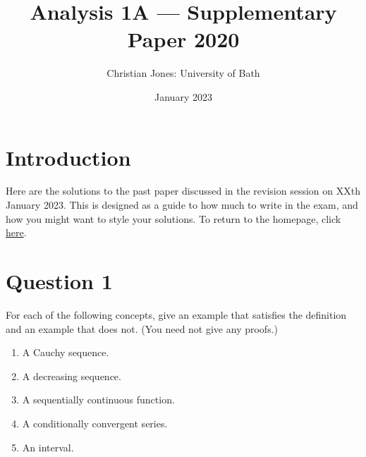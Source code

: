 \documentclass[
  12pt,
  a4paper]{extarticle}
\title{Analysis 1A --- Supplementary Paper 2020}
\author{Christian Jones: University of Bath}
\date{January 2023}
\providecommand{\tightlist}{%
  \setlength{\itemsep}{0pt}\setlength{\parskip}{0pt}}
\theoremstyle{plain}
\theoremstyle{definition}
\theoremstyle{plain}
\theoremstyle{plain}
\theoremstyle{plain}
\theoremstyle{plain}
\theoremstyle{definition}
\theoremstyle{definition}
\newtheorem*{Order Axioms*}{Order Axioms}\newtheorem{Order Axioms}{Order Axioms}[section]
\theoremstyle{remark}
\theoremstyle{remark}
\let\BeginKnitrBlock\begin \let\EndKnitrBlock\end
\renewcommand{\;}{\,}
\begin{document}
\maketitle

{
\setcounter{tocdepth}{2}
\tableofcontents
}
\newpage
{}

\hypertarget{introduction}{%
\section*{Introduction}\label{introduction}}

Here are the solutions to the past paper discussed in the revision session on XXth January 2023. This is designed as a guide to how much to write in the exam, and how you might want to style your solutions. To return to the homepage, click \href{http://caj50.github.io/tutoring.html}{here}.

\hypertarget{question-1}{%
\section{Question 1}\label{question-1}}

\BeginKnitrBlock{example}
{\label{exm:ex1} }For each of the following concepts, give an example that satisfies the definition and an example that does not. (You need not give any proofs.)

\begin{enumerate}
\def\labelenumi{\alph{enumi})}
\tightlist
\item
  A Cauchy sequence.
\item
  A decreasing sequence.
\item
  A sequentially continuous function.
\item
  A conditionally convergent series.
\item
  An interval.
\end{enumerate}
\EndKnitrBlock{example}
\end{document}
